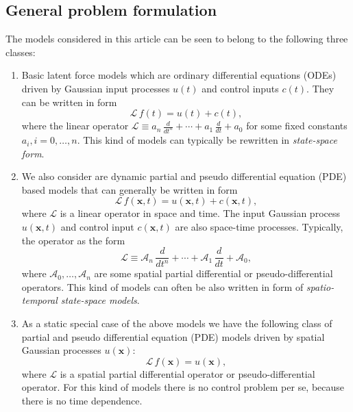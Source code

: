 \documentclass[journal]{IEEEtran}
\begin{document}
\subsection{General problem formulation}
%
The models considered in this article can be seen to belong to the following three classes:
%
\begin{enumerate}
\item Basic latent force models which are ordinary differential equations (ODEs) driven by Gaussian input processes $u(t)$ and control inputs $c(t)$. They can be written in form
%
\begin{equation}
  \mathcal{L} \, f(t) = u(t) + c(t),
\end{equation}
%
where the linear operator $\mathcal{L}\equiv a_n \, \frac{d}{dt^{n}} + \cdots + a_1 \, \frac{d}{dt} + a_0$ for some fixed constants $a_i, i=0,\ldots,n$. This kind of models can typically be rewritten in 
\emph{state-space form}. %

\item We also consider are dynamic partial and pseudo differential equation (PDE) based models that can generally be written in form
%
\begin{equation}
  \mathcal{L} \, f(\mathbf{x},t) = u(\mathbf{x},t) + c(\mathbf{x},t),
\end{equation}
%
where $\mathcal{L}$ is a linear operator in space and time. The input Gaussian process $u(\mathbf{x},t)$ and control input $c(\mathbf{x},t)$ are also space-time processes. Typically, the operator as the form
%
\begin{equation}
  \mathcal{L}\equiv \mathcal{A}_n \, \frac{d}{dt^{n}} + \cdots + \mathcal{A}_1 \, \frac{d}{dt} + \mathcal{A}_0,
\end{equation}
%
where $\mathcal{A}_0,\ldots,\mathcal{A}_n$ are some spatial partial differential or pseudo-differential operators. This kind of models can often be also written in form of \emph{spatio-temporal state-space models}. %

\item As a static special case of the above models we have the following class of partial and pseudo differential equation (PDE) models driven by spatial Gaussian processes $u(\mathbf{x})$:
%
\begin{equation}
  \mathcal{L} \, f(\mathbf{x}) = u(\mathbf{x}),
\end{equation}
%
where $\mathcal{L}$ is a spatial partial differential operator or pseudo-differential operator. For this kind of models there is no control problem per se, because there is no time dependence. 
\end{enumerate}
\end{document}

